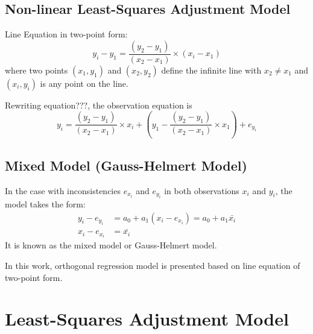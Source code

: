 \subsection{Non-linear Least-Squares Adjustment Model}
\label{subsec:2.3.2.NonLinear}

Line Equation in two-point form:
\begin{equation} %
y_i-y_1 = \dfrac{(y_2-y_1)}{(x_2-x_1)}\times(x_i-x_1)
\end{equation}
where two points $(x_1,y_1)$ and $(x_2,y_2)$ define the infinite line with $x_2\neq x_1$ and $(x_i,y_i)$ is any point on the line.

Rewriting equation???, the observation equation is 
\begin{equation} %
y_i = \dfrac{(y_2-y_1)}{(x_2-x_1)}\times x_i+(y_1-\dfrac{(y_2-y_1)}{(x_2-x_1)}\times x_1) + e_{y_i}
\end{equation}


\subsection{Mixed Model (Gauss-Helmert Model)}
\label{subsec:2.3.3.MixedModel}

In the case with inconsistencies $e_{x_i}$ and $e_{y_i}$ in both observations $x_i$ and $y_i$, the model takes the form:
\begin{equation} %
\begin{split}
y_i - e_{y_i} &= a_0 + a_1(x_i-e_{x_i}) = a_0 + a_1\bar{x_i}\\
x_i-e_{x_i} &= \bar{x_i}
\end{split}
\end{equation}
It is known as the mixed model or Gauss-Helmert model.






In this work, orthogonal regression model is presented based on line equation of two-point form.





\section{Least-Squares Adjustment Model}
\label{sec:2.4}








